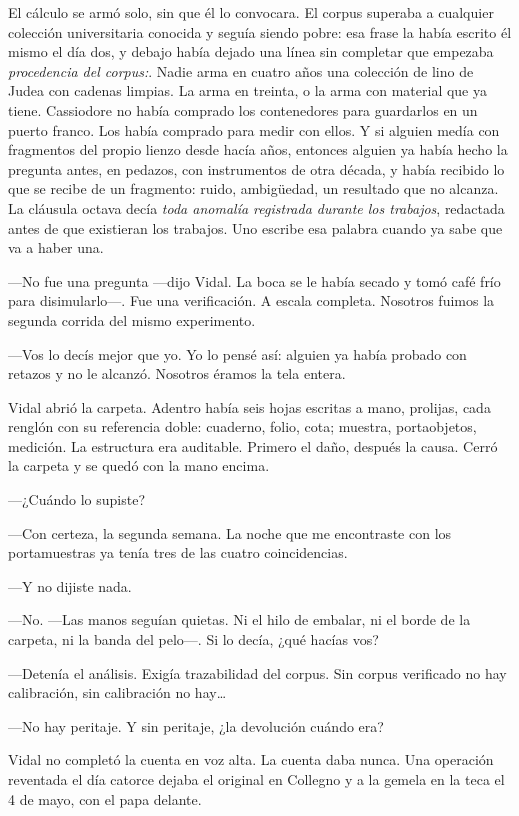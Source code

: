 El cálculo se armó solo, sin que él lo convocara. El corpus superaba a cualquier colección universitaria conocida y seguía siendo pobre: esa frase la había escrito él mismo el día dos, y debajo había dejado una línea sin completar que empezaba \textit{procedencia del corpus:}. Nadie arma en cuatro años una colección de lino de Judea con cadenas limpias. La arma en treinta, o la arma con material que ya tiene. Cassiodore no había comprado los contenedores para guardarlos en un puerto franco. Los había comprado para medir con ellos. Y si alguien medía con fragmentos del propio lienzo desde hacía años, entonces alguien ya había hecho la pregunta antes, en pedazos, con instrumentos de otra década, y había recibido lo que se recibe de un fragmento: ruido, ambigüedad, un resultado que no alcanza. La cláusula octava decía \textit{toda anomalía registrada durante los trabajos}, redactada antes de que existieran los trabajos. Uno escribe esa palabra cuando ya sabe que va a haber una.

---No fue una pregunta ---dijo Vidal. La boca se le había secado y tomó café frío para disimularlo---. Fue una verificación. A escala completa. Nosotros fuimos la segunda corrida del mismo experimento.

---Vos lo decís mejor que yo. Yo lo pensé así: alguien ya había probado con retazos y no le alcanzó. Nosotros éramos la tela entera.

Vidal abrió la carpeta. Adentro había seis hojas escritas a mano, prolijas, cada renglón con su referencia doble: cuaderno, folio, cota; muestra, portaobjetos, medición. La estructura era auditable. Primero el daño, después la causa. Cerró la carpeta y se quedó con la mano encima.

---¿Cuándo lo supiste?

---Con certeza, la segunda semana. La noche que me encontraste con los portamuestras ya tenía tres de las cuatro coincidencias.

---Y no dijiste nada.

---No. ---Las manos seguían quietas. Ni el hilo de embalar, ni el borde de la carpeta, ni la banda del pelo---. Si lo decía, ¿qué hacías vos?

---Detenía el análisis. Exigía trazabilidad del corpus. Sin corpus verificado no hay calibración, sin calibración no hay\ldots{}

---No hay peritaje. Y sin peritaje, ¿la devolución cuándo era?

Vidal no completó la cuenta en voz alta. La cuenta daba nunca. Una operación reventada el día catorce dejaba el original en Collegno y a la gemela en la teca el 4 de mayo, con el papa delante.

